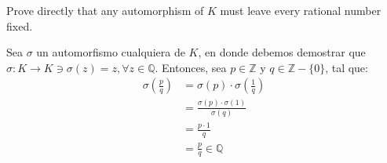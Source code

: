 \begin{problema}[Problema 6]
    Prove directly that any automorphism of $K$ must leave every rational number fixed.
    \begin{dem}
        Sea $\sigma$ un automorfismo cualquiera de $K$, en donde debemos demostrar que $\sigma:K\to K\ni \sigma(z)=z,\forall z\in \mathbb{Q}$. Entonces, sea $p\in\mathbb{Z}$ y $q\in \mathbb{Z}-\{0\}$, tal que: 
        \begin{align*}
            \sigma\left(\frac{p}{q}\right) &= \sigma(p)\cdot\sigma\left(\frac{1}{q}\right)\\
            &= \frac{\sigma(p)\cdot \sigma(1)}{\sigma(q)}\\
            &= \frac{p\cdot 1}{q}\\
            &= \frac{p}{q}\in \mathbb{Q}
        \end{align*}
    \end{dem}
\end{problema}

